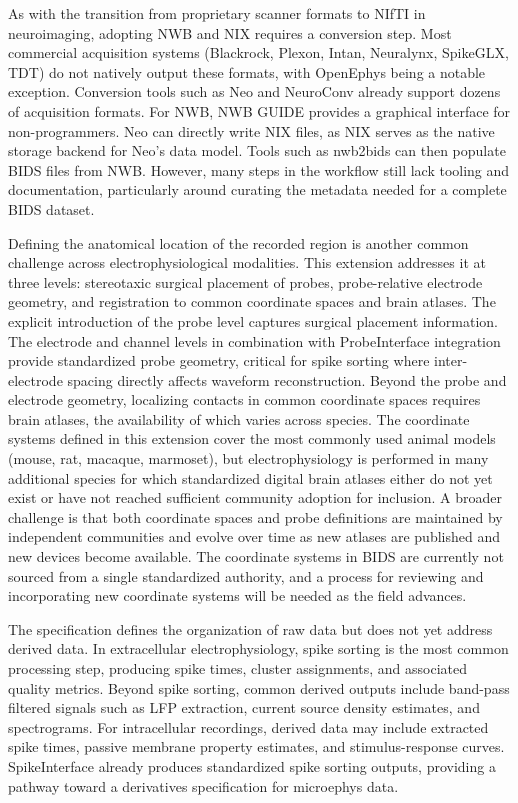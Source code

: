 \documentclass[fleqn,10pt]{article}
\begin{document}
As with the transition from proprietary scanner formats to NIfTI in neuroimaging, adopting NWB and NIX requires a conversion step.
Most commercial acquisition systems (Blackrock, Plexon, Intan, Neuralynx, SpikeGLX, TDT) do not natively output these formats, with OpenEphys being a notable exception.
Conversion tools such as Neo and NeuroConv already support dozens of acquisition formats.
For NWB, NWB GUIDE provides a graphical interface for non-programmers.
Neo can directly write NIX files, as NIX serves as the native storage backend for Neo's data model.
Tools such as nwb2bids can then populate BIDS files from NWB.
However, many steps in the workflow still lack tooling and documentation, particularly around curating the metadata needed for a complete BIDS dataset.

Defining the anatomical location of the recorded region is another common challenge across electrophysiological modalities.
This extension addresses it at three levels: stereotaxic surgical placement of probes, probe-relative electrode geometry, and registration to common coordinate spaces and brain atlases.
The explicit introduction of the probe level captures surgical placement information.
The electrode and channel levels in combination with ProbeInterface integration provide standardized probe geometry, critical for spike sorting where inter-electrode spacing directly affects waveform reconstruction.
Beyond the probe and electrode geometry, localizing contacts in common coordinate spaces requires brain atlases, the availability of which varies across species.
The coordinate systems defined in this extension cover the most commonly used animal models (mouse, rat, macaque, marmoset), but electrophysiology is performed in many additional species for which standardized digital brain atlases either do not yet exist or have not reached sufficient community adoption for inclusion.
A broader challenge is that both coordinate spaces and probe definitions are maintained by independent communities and evolve over time as new atlases are published and new devices become available.
The coordinate systems in BIDS are currently not sourced from a single standardized authority, and a process for reviewing and incorporating new coordinate systems will be needed as the field advances.

The specification defines the organization of raw data but does not yet address derived data.
In extracellular electrophysiology, spike sorting is the most common processing step, producing spike times, cluster assignments, and associated quality metrics.
Beyond spike sorting, common derived outputs include band-pass filtered signals such as LFP extraction, current source density estimates, and spectrograms.
For intracellular recordings, derived data may include extracted spike times, passive membrane property estimates, and stimulus-response curves.
SpikeInterface already produces standardized spike sorting outputs, providing a pathway toward a derivatives specification for microephys data.
\end{document}
